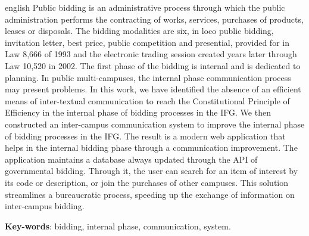 \begin{resumo}[Abstract]
 \begin{otherlanguage*}{english}
Public bidding is an administrative process through which the public administration performs the contracting of works, services, purchases of products, leases or disposals.
The bidding modalities are six, in loco public bidding, invitation letter, best price, public competition and presential, provided for in Law 8,666 of 1993 and the electronic trading session created years later through Law 10,520 in 2002.
The first phase of the bidding is internal and is dedicated to planning.
In public multi-campuses, the internal phase communication process may present problems.
In this work, we have identified the absence of an efficient means of inter-textual communication to reach the Constitutional Principle of Efficiency in the internal phase of bidding processes in the IFG.
We then constructed an inter-campus communication system to improve the internal phase of bidding processes in the IFG.
The result is a modern web application that helps in the internal bidding phase through a communication improvement.
The application maintains a database always updated through the API of governmental bidding.
Through it, the user can search for an item of interest by its code or description, or join the purchases of other campuses.
This solution streamlines a bureaucratic process, speeding up the exchange of information on inter-campus bidding.

   \vspace{\onelineskip}
 
   \noindent 
   \textbf{Key-words}: bidding, internal phase, communication, system.
 \end{otherlanguage*}
\end{resumo}
